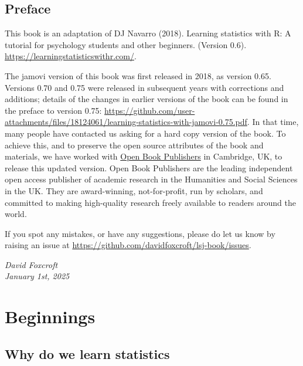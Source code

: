 \documentclass[
  a4paper,
]{book}
\renewcommand*\contentsname{Table of contents}
\newcommand\contentsname{Table of contents}
\begin{document}
\renewcommand*\contentsname{Table of contents}
{
\hypersetup{linkcolor=}
\setcounter{tocdepth}{2}
\tableofcontents
}
\mainmatter
{}

\hypertarget{preface}{%
\chapter*{Preface}\label{preface}}


This book is an adaptation of DJ Navarro (2018). Learning statistics
with R: A tutorial for psychology students and other beginners. (Version
0.6). \url{https://learningstatisticswithr.com/}.

The jamovi version of this book was first released in 2018, as version
0.65. Versions 0.70 and 0.75 were released in subsequent years with
corrections and additions; details of the changes in earlier versions of
the book can be found in the preface to version 0.75:
\url{https://github.com/user-attachments/files/18124061/learning-statistics-with-jamovi-0.75.pdf}.
In that time, many people have contacted us asking for a hard copy
version of the book. To achieve this, and to preserve the open source
attributes of the book and materials, we have worked with
\href{https://www.openbookpublishers.com/books/10.11647/obp.0333}{Open
Book Publishers} in Cambridge, UK, to release this updated version. Open
Book Publishers are the leading independent open access publisher of
academic research in the Humanities and Social Sciences in the UK. They
are award-winning, not-for-profit, run by scholars, and committed to
making high-quality research freely available to readers around the
world.

If you spot any mistakes, or have any suggestions, please do let us know
by raising an issue at
\url{https://github.com/davidfoxcroft/lsj-book/issues}.

\emph{David Foxcroft\\
January 1st, 2025}

\part{Beginnings}

\hypertarget{why-do-we-learn-statistics}{%
\chapter{Why do we learn statistics}\label{why-do-we-learn-statistics}}
\end{document}
